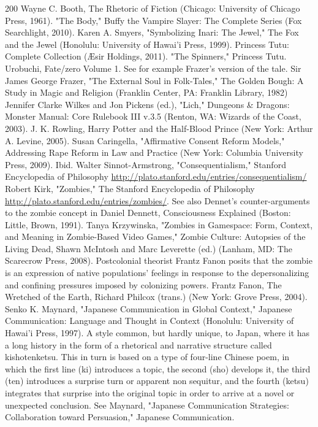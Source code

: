 \begin{thebibliography}{200}
    Wayne C. Booth, The Rhetoric of Fiction (Chicago: University of Chicago Press, 1961).
    "The Body," Buffy the Vampire Slayer: The Complete Series (Fox Searchlight, 2010).
    Karen A. Smyers, "Symbolizing Inari: The Jewel," The Fox and the Jewel (Honolulu: University of Hawai'i Press, 1999).
    Princess Tutu: Complete Collection (Æsir Holdings, 2011).
    "The Spinners," Princess Tutu.
    Urobuchi, Fate/zero Volume 1.
    See for example Frazer's version of the tale. Sir James George Frazer, "The External Soul in Folk-Tales," The Golden Bough: A Study in Magic and Religion (Franklin Center, PA: Franklin Library, 1982)
    Jennifer Clarke Wilkes and Jon Pickens (ed.), "Lich," Dungeons \& Dragons: Monster Manual: Core Rulebook III v.3.5 (Renton, WA: Wizards of the Coast, 2003).
    J. K. Rowling, Harry Potter and the Half-Blood Prince (New York: Arthur A. Levine, 2005).
    Susan Caringella, "Affirmative Consent Reform Models," Addressing Rape Reform in Law and Practice (New York: Columbia University Press, 2009).
    Ibid.
    Walter Sinnot-Armstrong, "Consequentialism," Stanford Encyclopedia of Philosophy \url{http://plato.stanford.edu/entries/consequentialism/}
    Robert Kirk, "Zombies," The Stanford Encyclopedia of Philosophy \url{http://plato.stanford.edu/entries/zombies/}. See also Dennet's counter-arguments to the zombie concept in Daniel Dennett, Consciousness Explained (Boston: Little, Brown, 1991).
    Tanya Krzywinska, "Zombies in Gamespace: Form, Context, and Meaning in Zombie-Based Video Games," Zombie Culture: Autopsies of the Living Dead, Shawn McIntosh and Marc Leverette (ed.) (Lanham, MD: The Scarecrow Press, 2008).
    Postcolonial theorist Frantz Fanon posits that the zombie is an expression of native populations' feelings in response to the depersonalizing and confining pressures imposed by colonizing powers. Frantz Fanon, The Wretched of the Earth, Richard Philcox (trans.) (New York: Grove Press, 2004).
    Senko K. Maynard, "Japanese Communication in Global Context," Japanese Communication: Language and Thought in Context (Honolulu: University of Hawai'i Press, 1997).
    A style common, but hardly unique, to Japan, where it has a long history in the form of a rhetorical and narrative structure called kishotenketsu. This in turn is based on a type of four-line Chinese poem, in which the first line (ki) introduces a topic, the second (sho) develops it, the third (ten) introduces a surprise turn or apparent non sequitur, and the fourth (ketsu) integrates that surprise into the original topic in order to arrive at a novel or unexpected conclusion. See Maynard, "Japanese Communication Strategies: Collaboration toward Persuasion," Japanese Communication.

\end{thebibliography}
